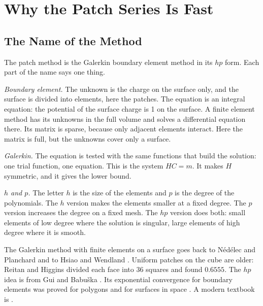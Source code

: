 \documentclass[journal]{IEEEtran}
\begin{document}
\section{Why the Patch Series Is Fast}
\subsection{The Name of the Method}
The patch method is the Galerkin boundary element method in its $hp$ form. Each part of the name says one thing.

\emph{Boundary element.} The unknown is the charge on the surface only, and the surface is divided into elements, here the patches. The equation is an integral equation: the potential of the surface charge is 1 on the surface. A finite element method has its unknowns in the full volume and solves a differential equation there. Its matrix is sparse, because only adjacent elements interact. Here the matrix is full, but the unknowns cover only a surface.

\emph{Galerkin.} The equation is tested with the same functions that build the solution: one trial function, one equation. This is the system $HC = m$. It makes $H$ symmetric, and it gives the lower bound.

\emph{$h$ and $p$.} The letter $h$ is the size of the elements and $p$ is the degree of the polynomials. The $h$ version makes the elements smaller at a fixed degree. The $p$ version increases the degree on a fixed mesh. The $hp$ version does both: small elements of low degree where the solution is singular, large elements of high degree where it is smooth.

The Galerkin method with finite elements on a surface goes back to N\'ed\'elec and Planchard \cite{nedelec} and to Hsiao and Wendland \cite{hsiao}. Uniform patches on the cube are older: Reitan and Higgins \cite{reitan} divided each face into 36 squares and found $0.6555$. The $hp$ idea is from Gui and Babu\v{s}ka \cite{gui}. Its exponential convergence for boundary elements was proved for polygons \cite{babuska} and for surfaces in space \cite{heuer}. A modern textbook is \cite{sauter}.
\end{document}
